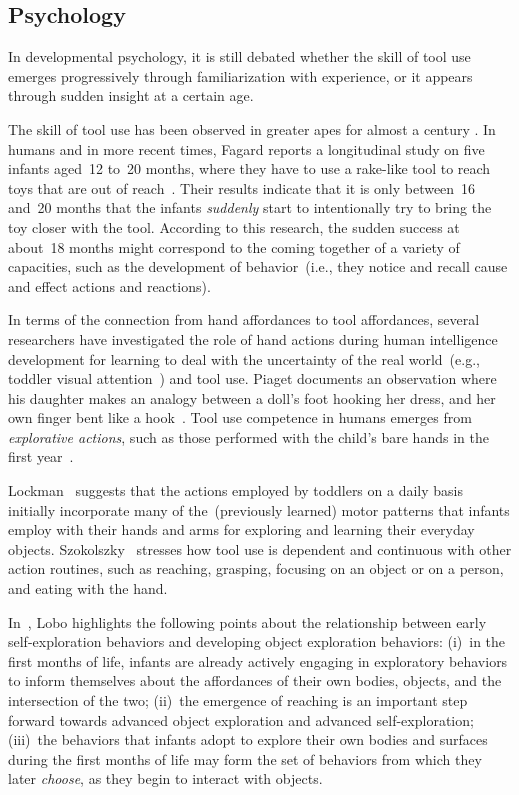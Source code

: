 \subsection{Psychology}
\label{sec:tool:related_work:psychology}

In developmental psychology, it is still debated whether the skill of tool use
emerges progressively through familiarization with experience, or
it appears through sudden insight at a certain age.

The skill of tool use has been observed in greater apes for almost a century \cite{kohler:mentality_of_apes}.
In humans and in more recent times, Fagard reports a longitudinal study on five infants aged~12 to~20 months, where they have to use a rake-like tool to reach toys that are out of reach~\cite{fagard:2014:emergence}.
Their results indicate that it is only between~16 and~20 months that the infants \emph{suddenly} start to intentionally try to bring the toy closer with the tool.
According to this research, the sudden success at about~18 months might correspond to the coming together of a variety of capacities, such as the development of \meansend{} behavior~(i.e., they notice and recall cause and effect actions and reactions).

In terms of the connection from hand affordances to tool affordances, several researchers have investigated the role of hand actions during human intelligence development for learning to deal with the uncertainty of the real world~(e.g., toddler visual attention~\cite{yu:2009:tamd}) and tool use.
Piaget documents an observation where his daughter makes an analogy between a doll's foot hooking her dress, and her own finger bent like a hook~\cite{piaget:1962}.
Tool use competence in humans emerges from \emph{explorative actions}, such as those performed with the child's bare hands in the first year~\cite{smith:2014:jecp}.

Lockman~\cite{lockman:2000:childdev} suggests that the actions employed by toddlers on a daily basis initially incorporate many of the~(previously learned) motor patterns that infants employ with their hands and arms for exploring and learning their everyday objects.
Szokolszky~\cite{szokolszky:2010} stresses how tool use is dependent and continuous with other action routines, such as reaching, grasping, focusing on an object or on a person, and eating with the hand.

In~\cite{lobo:2013:ibd}, Lobo highlights the following points about the relationship between early self-exploration behaviors and developing object exploration behaviors:
(i)~in the first months of life, infants are already actively engaging in exploratory behaviors to inform themselves about the affordances of their own bodies, objects, and the intersection of the two;
(ii)~the emergence of reaching is an important step forward towards advanced object exploration and advanced self-exploration;
(iii)~the behaviors that infants adopt to explore their own bodies and surfaces during the first months of life may form the set of behaviors from which they later \emph{choose}, as they begin to interact with objects.


